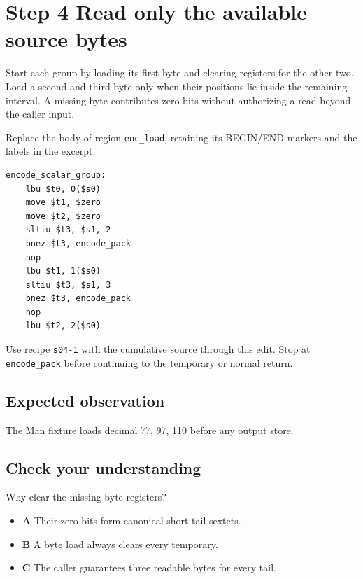 \section{Step 4 Read only the available source bytes}\label{base64-s04}

Start each group by loading its first byte and clearing registers for the other two. Load a second and third byte only when their positions lie inside the remaining interval. A missing byte contributes zero bits without authorizing a read beyond the caller input.

Replace the body of region \texttt{enc\_load}, retaining its BEGIN/END markers and the labels in the excerpt.

\begin{verbatim}
encode_scalar_group:
    lbu $t0, 0($s0)
    move $t1, $zero
    move $t2, $zero
    sltiu $t3, $s1, 2
    bnez $t3, encode_pack
    nop
    lbu $t1, 1($s0)
    sltiu $t3, $s1, 3
    bnez $t3, encode_pack
    nop
    lbu $t2, 2($s0)
\end{verbatim}

Use recipe \texttt{s04-1} with the cumulative source through this edit. Stop at \texttt{encode\_pack} before continuing to the temporary or normal return.

\subsection{Expected observation}
The Man fixture loads decimal 77, 97, 110 before any output store.

\subsection{Check your understanding}
Why clear the missing-byte registers?

\begin{itemize}
  \item \textbf{A} Their zero bits form canonical short-tail sextets.
  \item \textbf{B} A byte load always clears every temporary.
  \item \textbf{C} The caller guarantees three readable bytes for every tail.
\end{itemize}
